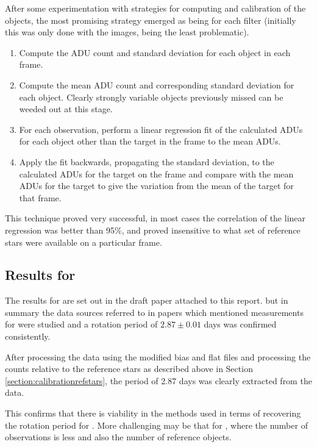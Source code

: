 After some experimentation with strategies for computing and calibration of the
objects, the most promising strategy emerged as being for each filter
(initially this was only done with the {\rfilter} images, being the least
problematic).

\begin{enumerate}
  \item Compute the ADU count and standard deviation for each object in each
  frame.
  \item Compute the mean ADU count and corresponding standard
  deviation for each object. Clearly strongly variable objects previously missed can be weeded out
  at this stage.
  \item For each observation, perform a linear regression fit of the calculated
  ADUs for each object other than the target in the frame to the mean ADUs.
  \item Apply the fit backwards, propagating the standard deviation, to the
  calculated ADUs for the target on the frame and compare with the mean ADUs for
  the target to give the variation from the mean of the target for that frame.
\end{enumerate}

This technique proved very successful, in most cases the correlation of the
linear regression was better than 95\%, and proved insensitive to what set of
reference stars were available on a particular frame.

\subsection{Results for \ross}
\protect\label{section:resultsross}

The results for {\ross} are set out in the draft paper attached to this report.
but in summary the data sources referred to in papers which mentioned
measurements for {\ross} were studied and a rotation period of $2.87 \pm 0.01$
days was confirmed consistently.

After processing the data using the modified bias and flat files and processing
the counts relative to the reference stars as described above in Section
\ref{section:calibrationrefstars}, the period of 2.87 days was clearly extracted
from the data.

This confirms that there is viability in the methods used in terms of recovering
the rotation period for \ross. More challenging may be that for \bstar, where
the number of observations is less and also the number of reference objects.

